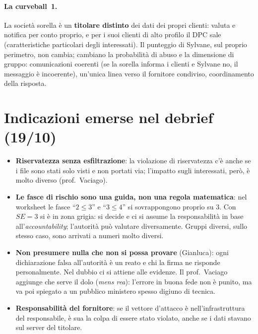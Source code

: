 \begin{integrazione}
\paragraph{La curveball~1.} La società sorella è un \textbf{titolare distinto} dei dati dei propri
clienti: valuta e notifica per conto proprio, e per i suoi clienti di alto profilo il DPC sale
(caratteristiche particolari degli interessati). Il punteggio di Sylvane, sul proprio perimetro, non
cambia; cambiano la probabilità di abuso e la dimensione di gruppo: comunicazioni coerenti (se la
sorella informa i clienti e Sylvane no, il messaggio è incoerente), un'unica linea verso il fornitore
condiviso, coordinamento della risposta.
\end{integrazione}

\section{Indicazioni emerse nel debrief (19/10)}
\begin{esame}
\begin{itemize}
  \item \textbf{Riservatezza senza esfiltrazione}: la violazione di riservatezza c'è anche se i file
    sono stati solo visti e non portati via; l'impatto sugli interessati, però, è molto diverso
    (prof.~Vaciago).
  \item \textbf{Le fasce di rischio sono una guida, non una regola matematica}: nel worksheet le fasce
    ``$2 \le 3$'' e ``$3 \le 4$'' si sovrappongono proprio su 3. Con $SE = 3$ si è in zona grigia: si
    decide e ci si assume la responsabilità in base all'\emph{accountability}; l'autorità può valutare
    diversamente. Gruppi diversi, sullo stesso caso, sono arrivati a numeri molto diversi.
  \item \textbf{Non presumere nulla che non si possa provare} (Gianluca): ogni dichiarazione falsa
    all'autorità è un reato e chi la firma ne risponde personalmente. Nel dubbio ci si attiene alle
    evidenze. Il prof.~Vaciago aggiunge che serve il dolo (\emph{mens rea}): l'errore in buona fede
    non è punito, ma va poi spiegato a un pubblico ministero spesso digiuno di tecnica.
  \item \textbf{Responsabilità del fornitore}: se il vettore d'attacco è nell'infrastruttura del
    responsabile, è sua la colpa di essere stato violato, anche se i dati stavano sul server del
    titolare.
\end{itemize}
\end{esame}


